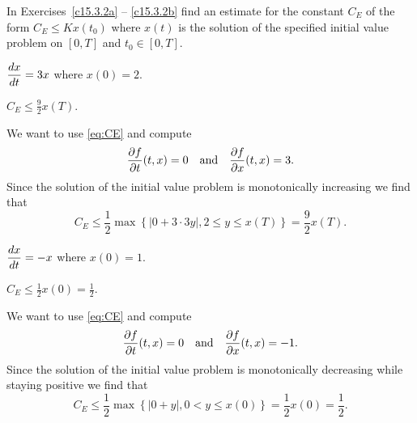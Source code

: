 \documentclass{ximera}
\begin{document}
\noindent In Exercises~\ref{c15.3.2a} -- \ref{c15.3.2b} find an estimate
for the constant $C_E$ of the form $C_E \le Kx(t_0)$ where $x(t)$ is the
solution of the specified initial value problem on $[0,T]$ and $t_0\in[0,T]$.
\begin{exercise} \label{c15.3.2a}
$\displaystyle\frac{dx}{dt} = 3 x$ where $x(0) = 2$.

\begin{solution}
\ans $C_E \le \frac{9}{2}x(T)$.

\soln We want to use \eqref{eq:CE} and compute
\[
\frac{\partial f}{\partial t}(t,x)=0\quad\mbox{and}\quad
\frac{\partial f}{\partial x}(t,x)=3.
\]
Since the solution of the initial value problem is monotonically
increasing we find that
\[
C_E\le \frac{1}{2}\max\left\{ \left\vert 0+3\cdot 3y\right\vert,
2\le y\le x(T) \right\} = \frac{9}{2}x(T).
\]

\end{solution}
\end{exercise}
\begin{exercise} \label{c15.3.2b}
$\displaystyle\frac{dx}{dt} = -x$ where $x(0) = 1$.

\begin{solution}
\ans $C_E \le \frac{1}{2}x(0)=\frac{1}{2}$.

\soln We want to use \eqref{eq:CE} and compute
\[
\frac{\partial f}{\partial t}(t,x)=0\quad\mbox{and}\quad
\frac{\partial f}{\partial x}(t,x)=-1.
\]
Since the solution of the initial value problem is monotonically
decreasing while staying positive we find that
\[
C_E\le \frac{1}{2}\max\left\{ \left\vert 0+y\right\vert,
0<y\le x(0) \right\} = \frac{1}{2}x(0)=\frac{1}{2}.
\]


\end{solution}
\end{exercise}
\end{document}
